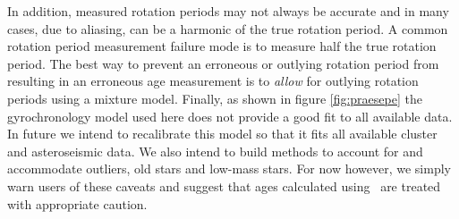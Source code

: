 In addition, measured rotation periods may not always be accurate and in many
cases, due to aliasing, can be a harmonic of the true rotation period.
A common rotation period measurement failure mode is to measure half the true
rotation period.
The best way to prevent an erroneous or outlying rotation period from
resulting in an erroneous age measurement is to {\it allow} for outlying
rotation periods using a mixture model.
Finally, as shown in figure \ref{fig:praesepe} the gyrochronology model used
here \citep{angus2015} does not provide a good fit to all available data.
In future we intend to recalibrate this model so that it fits all available
cluster and asteroseismic data.
We also intend to build methods to account for and accommodate outliers,
old stars and low-mass stars.
For now however, we simply warn users of these caveats and suggest that ages
calculated using \sd\ are treated with appropriate caution.


